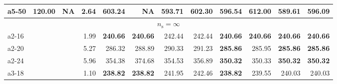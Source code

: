 \documentclass[aspectratio=1610]{beamer}
\begin{document}
\begin{frame}
\begin{table}[]
{\begin{tabular}{lrrrrrrrrrrr}
a5-50                                          & 120.00       & \multicolumn{1}{r|}{NA}                                     & 2.64              & 603.24          & \multicolumn{1}{r|}{NA}                                     & 593.71          & \multicolumn{1}{r|}{602.30}   & 596.54          & \multicolumn{1}{r|}{612.00}                                 & \textbf{589.61} & {\color[HTML]{FE0000} \textbf{596.09}} \\ \hline
\multicolumn{12}{c}{$n_\mathrm{s} = \infty$}                                                                                                                                                                                                                                                                                                                                                                                 \\ \hline
a2-16                                          &              & \multicolumn{1}{r|}{}                                       & 1.99              & \textbf{240.66} & \multicolumn{1}{r|}{{\color[HTML]{FE0000} \textbf{240.66}}} & 242.44          & \multicolumn{1}{r|}{242.44}   & \textbf{240.66} & \multicolumn{1}{r|}{{\color[HTML]{FE0000} \textbf{240.66}}} & \textbf{240.66} & {\color[HTML]{FE0000} \textbf{240.66}} \\
a2-20                                          &              & \multicolumn{1}{r|}{}                                       & 5.27              & 286.32          & \multicolumn{1}{r|}{288.89}                                 & 290.33          & \multicolumn{1}{r|}{291.23}   & \textbf{285.86} & \multicolumn{1}{r|}{285.95}                                 & \textbf{285.86} & {\color[HTML]{FE0000} \textbf{285.86}} \\
a2-24                                          &              & \multicolumn{1}{r|}{}                                       & 5.96              & 354.38          & \multicolumn{1}{r|}{374.68}                                 & 354.53          & \multicolumn{1}{r|}{356.89}   & \textbf{350.32} & \multicolumn{1}{r|}{350.33}                                 & \textbf{350.32} & {\color[HTML]{FE0000} \textbf{350.32}} \\
a3-18                                          &              & \multicolumn{1}{r|}{}                                       & 1.10              & \textbf{238.82} & \multicolumn{1}{r|}{{\color[HTML]{FE0000} \textbf{238.82}}} & 241.95          & \multicolumn{1}{r|}{242.46}   & \textbf{238.82} & \multicolumn{1}{r|}{239.55}                                 & 240.03          & 240.03                                 \\

\end{tabular}}
\end{table}
\end{frame}
\end{document}
